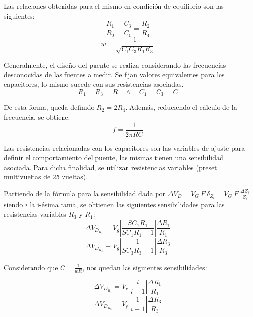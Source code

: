 Las relaciones obtenidas para el mismo en condición de equilibrio son las siguientes:
\begin{equation}
\frac{R_1}{R_3}+\frac{C_3}{C_1}=\frac{R_2}{R_4}
\end{equation}
\begin{equation}
w=\frac{1}{\sqrt{C_1C_3R_1R_3}}
\label{formula_frecuencia_sin_despejes}
\end{equation}

Generalmente, el diseño del puente se realiza considerando las frecuencias desconocidas de las fuentes a medir. Se fijan valores equivalentes para los capacitores, lo mismo sucede con sus resistencias asociadas. 
\begin{equation}
R_1=R_3=R \quad	\wedge \quad C_1=C_3=C
\end{equation}

De esta forma, queda definido $R_2=2R_4$. Además, reduciendo el cálculo de la frecuencia, se obtiene:
\begin{equation}
f=\frac{1}{2\pi RC}
\label{frec}
\end{equation}

Las resistencias relacionadas con los capacitores son las variables de ajuste para definir el comportamiento del puente, las mismas tienen una sensibilidad asociada. Para dicha finalidad, se utilizan resistencias variables (preset multivueltas de 25 vueltas). 

Partiendo de la fórmula para la sensibilidad dada por $\Delta V_D=V_G \ F \ \delta_{Z_i}=V_G \ F \ \frac{\Delta Z_i}{Z_i}$ siendo $i$ la i-ésima rama, se obtienen las siguientes sensibilidades para las resistencias variables $R_3$ y $R_1$:
\begin{equation}
\Delta V_{D_{R_1}}=V_g\left|\frac{SC_1R_1}{SC_1R_1+1}\right|\frac{\Delta R_1}{R_1}
\end{equation}
\begin{equation}
\Delta V_{D_{R_3}}=V_g\left|\frac{1}{SC_3R_3+1}\right|\frac{\Delta R_3}{R_3}
\end{equation}

Considerando que $C=\frac{1}{wR}$, nos quedan las siguientes sensibilidades:

\begin{equation}
\Delta V_{D_{R_1}}=V_g\left|\frac{i}{i+1}\right|\frac{\Delta R_1}{R_1}
\label{VDR_1}
\end{equation}
\begin{equation}
\Delta V_{D_{R_3}}=V_g\left|\frac{1}{i+1}\right|\frac{\Delta R_3}{R_3}
\label{VDR_3}
\end{equation}

